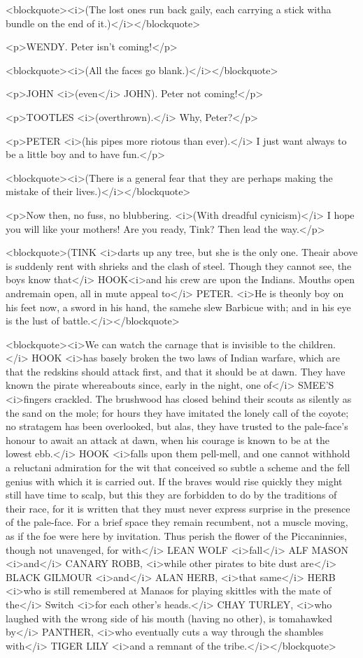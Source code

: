 <blockquote><i>(The lost ones run back gaily, each carrying a stick
witha bundle on the end of it.)</i></blockquote>

<p>WENDY. Peter isn't coming!</p>

<blockquote><i>(All the faces go blank.)</i></blockquote>

<p>JOHN <i>(even</i> JOHN). Peter not coming!</p>

<p>TOOTLES <i>(overthrown).</i> Why, Peter?</p>

<p>PETER <i>(his pipes more riotous than ever).</i> I just want
always to be a little boy and to have fun.</p>

<blockquote><i>(There is a general fear that they are perhaps making
the mistake of their lives.)</i></blockquote>

<p>Now then, no fuss, no blubbering. <i>(With dreadful cynicism)</i>
I hope you will like your mothers! Are you ready, Tink? Then lead the
way.</p>

<blockquote>(TINK <i>darts up any tree, but she is the only one.
Theair above is suddenly rent with shrieks and the clash of steel.
Though they cannot see, the boys know that</i> HOOK<i>and his crew
are upon the Indians. Mouths open andremain open, all in mute appeal
to</i> PETER. <i>He is theonly boy on his feet now, a sword in his
hand, the samehe slew Barbicue with; and in his eye is the lust of
battle.</i></blockquote>

<blockquote><i>We can watch the carnage that is invisible to the
children.</i> HOOK <i>has basely broken the two laws of Indian
warfare, which are that the redskins should attack first, and that it
should be at dawn. They have known the pirate whereabouts since,
early in the night, one of</i> SMEE'S <i>fingers crackled. The
brushwood has closed behind their scouts as silently as the sand on
the mole; for hours they have imitated the lonely call of the coyote;
no stratagem has been overlooked, but alas, they have trusted to the
pale-face's honour to await an attack at dawn, when his courage is
known to be at the lowest ebb.</i> HOOK <i>falls upon them pell-mell,
and one cannot withhold a reluctani admiration for the wit that
conceived so subtle a scheme and the fell genius with which it is
carried out. If the braves would rise quickly they might still have
time to scalp, but this they are forbidden to do by the traditions of
their race, for it is written that they must never express surprise
in the presence of the pale-face. For a brief space they remain
recumbent, not a muscle moving, as if the foe were here by
invitation. Thus perish the flower of the Piccaninnies, though not
unavenged, for with</i> LEAN WOLF <i>fall</i> ALF MASON <i>and</i>
CANARY ROBB, <i>while other pirates to bite dust are</i> BLACK
GILMOUR <i>and</i> ALAN HERB, <i>that same</i> HERB <i>who is still
remembered at Manaos for playing skittles with the mate of the</i>
Switch <i>for each other's heads.</i> CHAY TURLEY, <i>who laughed
with the wrong side of his mouth (having no other), is tomahawked
by</i> PANTHER, <i>who eventually cuts a way through the shambles
with</i> TIGER LILY <i>and a remnant of the tribe.</i></blockquote>

